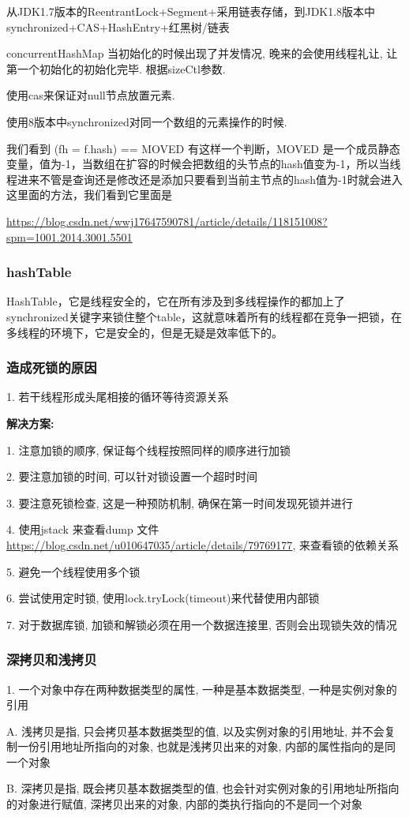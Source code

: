 从JDK1.7版本的ReentrantLock+Segment+采用链表存储，到JDK1.8版本中synchronized+CAS+HashEntry+红黑树/链表


concurrentHashMap 当初始化的时候出现了并发情况, 晚来的会使用线程礼让, 让第一个初始化的初始化完毕. 根据sizeCtl参数.

使用cas来保证对null节点放置元素.

使用8版本中synchronized对同一个数组的元素操作的时候.

我们看到 (fh = f.hash) == MOVED 有这样一个判断，MOVED 是一个成员静态变量，值为-1，当数组在扩容的时候会把数组的头节点的hash值变为-1，所以当线程进来不管是查询还是修改还是添加只要看到当前主节点的hash值为-1时就会进入这里面的方法，我们看到它里面是

\url{https://blog.csdn.net/wwj17647590781/article/details/118151008?spm=1001.2014.3001.5501}

\subsubsection{hashTable}
HashTable，它是线程安全的，它在所有涉及到多线程操作的都加上了synchronized关键字来锁住整个table，这就意味着所有的线程都在竞争一把锁，在多线程的环境下，它是安全的，但是无疑是效率低下的。
\subsubsection{造成死锁的原因}
1. 若干线程形成头尾相接的循环等待资源关系 \par
\textbf{解决方案:} \par
1. 注意加锁的顺序, 保证每个线程按照同样的顺序进行加锁 \par
2. 要注意加锁的时间, 可以针对锁设置一个超时时间 \par
3. 要注意死锁检查, 这是一种预防机制, 确保在第一时间发现死锁并进行 \par
4. 使用jstack 来查看dump 文件 \url{https://blog.csdn.net/u010647035/article/details/79769177}, 来查看锁的依赖关系 \par
5. 避免一个线程使用多个锁 \par
6. 尝试使用定时锁, 使用lock.tryLock(timeout)来代替使用内部锁 \par
7. 对于数据库锁, 加锁和解锁必须在用一个数据连接里, 否则会出现锁失效的情况 \par
\subsubsection{深拷贝和浅拷贝}
1. 一个对象中存在两种数据类型的属性, 一种是基本数据类型, 一种是实例对象的引用 \par
A. 浅拷贝是指, 只会拷贝基本数据类型的值, 以及实例对象的引用地址, 并不会复制一份引用地址所指向的对象, 也就是浅拷贝出来的对象, 内部的属性指向的是同一个对象 \par
B. 深拷贝是指, 既会拷贝基本数据类型的值, 也会针对实例对象的引用地址所指向的对象进行赋值, 深拷贝出来的对象, 内部的类执行指向的不是同一个对象 \par
